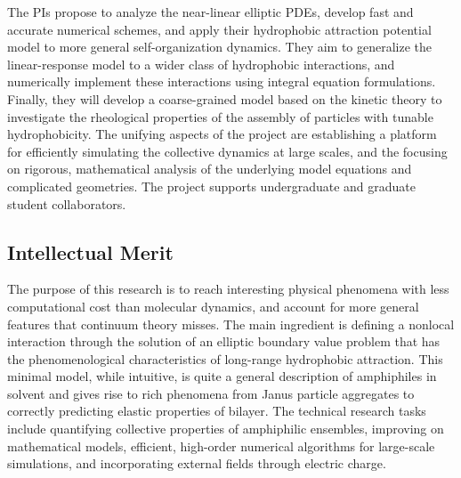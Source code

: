 \documentclass[10pt]{article}
\begin{document}
The PIs propose to analyze the near-linear elliptic PDEs, develop fast and accurate numerical schemes, 
and apply their hydrophobic attraction potential model to
more general self-organization dynamics. They aim to generalize the
linear-response model to  a wider class of hydrophobic interactions, and
numerically implement these interactions using integral equation
formulations. Finally, they will develop a coarse-grained model based on 
the kinetic theory to investigate the rheological properties of the assembly of 
particles with tunable hydrophobicity. The unifying
aspects of the project are establishing a platform for efficiently
simulating the collective dynamics at large scales, and the focusing on
rigorous, mathematical analysis of the underlying model equations and
complicated geometries. The project supports undergraduate and graduate
student collaborators.

\subsection*{Intellectual Merit}
\vspace{-0.1in}
The purpose of this research is to reach interesting physical phenomena
with less computational cost than molecular dynamics, and account for
more general features that continuum theory misses. The main ingredient
is defining a nonlocal interaction through the solution of an elliptic
boundary value problem that has the phenomenological characteristics of
long-range hydrophobic attraction. This minimal model, while intuitive,
is quite a general description of amphiphiles in solvent and gives rise
to rich phenomena from Janus particle aggregates to correctly predicting
elastic properties of bilayer. The technical research tasks include
quantifying collective properties of amphiphilic ensembles, improving on
mathematical models, efficient, high-order numerical algorithms for
large-scale simulations, and incorporating external fields through
electric charge.
\end{document}
